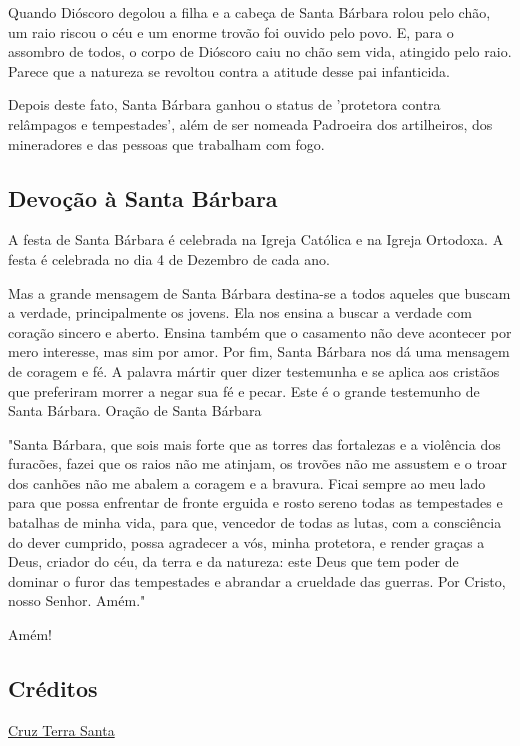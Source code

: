 \documentclass[11pt]{article}
\begin{document}
\begin{justify}
Quando Dióscoro degolou a filha e a cabeça de Santa Bárbara rolou pelo chão, um raio riscou o céu e um enorme trovão foi ouvido pelo povo. E, para o assombro de todos, o corpo de Dióscoro caiu no chão sem vida, atingido pelo raio. Parece que a natureza se revoltou contra a atitude desse pai infanticida.

Depois deste fato, Santa Bárbara ganhou o status de 'protetora contra relâmpagos e tempestades', além de ser nomeada Padroeira dos artilheiros, dos mineradores e das pessoas que trabalham com fogo.

\subsection{Devoção à Santa Bárbara}

A festa de Santa Bárbara é celebrada na Igreja Católica e na Igreja Ortodoxa. A festa é celebrada no dia 4 de Dezembro de cada ano.

Mas a grande mensagem de Santa Bárbara destina-se a todos aqueles que buscam a verdade, principalmente os jovens. Ela nos ensina a buscar a verdade com coração sincero e aberto. Ensina também que o casamento não deve acontecer por mero interesse, mas sim por amor. Por fim, Santa Bárbara nos dá uma mensagem de coragem e fé. A palavra mártir quer dizer testemunha e se aplica aos cristãos que preferiram morrer a negar sua fé e pecar. Este é o grande testemunho de Santa Bárbara.
Oração de Santa Bárbara

"Santa Bárbara, que sois mais forte que as torres das fortalezas e a violência dos furacões, fazei que os raios não me atinjam, os trovões não me assustem e o troar dos canhões não me abalem a coragem e a bravura. Ficai sempre ao meu lado para que possa enfrentar de fronte erguida e rosto sereno todas as tempestades e batalhas de minha vida, para que, vencedor de todas as lutas, com a consciência do dever cumprido, possa agradecer a vós, minha protetora, e render graças a Deus, criador do céu, da terra e da natureza: este Deus que tem poder de dominar o furor das tempestades e abrandar a crueldade das guerras. Por Cristo, nosso Senhor. Amém."

\end{justify}
Amém!

\subsection*{Créditos }
\href{https://cruzterrasanta.com.br/historia-de-santa-barbara/64/102/}{Cruz Terra Santa}
\end{document}
